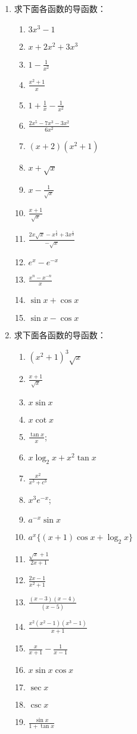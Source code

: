 \begin{ex}
\begin{enumerate}
    \item  求下面各函数的导函数：
\begin{multicols}{2}
\begin{enumerate}
    \item $3 x^{3}-1$
    \item  $x+2 x^{2}+3 x^{3}$
    \item  $1-\frac{1}{x^{2}}$
    \item $\frac{x^{2}+1}{x}$
    \item  $1+\frac{1}{x}-\frac{1}{x^{2}}$
    \item  $\frac{2 x^{5}-7 x^{3}-3 x^{2}}{6 x^{2}}$
    \item  $(x+2)\left(x^{2}+1\right)$
    \item  $x+\sqrt{x}$
    \item $x-\frac{1}{\sqrt{x}}$
    \item  $\frac{x+1}{\sqrt{x}}$
    \item  $\frac{2 x \sqrt{x}-x^{\tfrac{5}{2}}+3 x^{\tfrac{1}{2}}}{-\sqrt{x}}$ \item  $e^{x}-e^{-x}$
    \item $\frac{x^{n}-x^{-n}}{x} $
    \item $\sin x+\cos x$
    \item $\sin x-\cos x$
\end{enumerate}
\end{multicols}
\item  求下面各函数的导函数：
\begin{multicols}{2}
\begin{enumerate}
    \item $\left(x^{2}+1\right)^{3} \sqrt{x}$
    \item $\frac{x+1}{\sqrt{x}}$
    \item  $x \sin x$
    \item $x \cot  x$
    \item  $\frac{\tan  x}{x}$;
    \item  $x \log _{2} x+x^{2} \tan  x$
    \item  $\frac{x^{2}}{x^{3}+c^{3}}$
    \item  $x^{3} e^{-x}$;
    \item  $a^{-x} \sin x$ 
    \item $a^{x}\{(x+1) \cos x+\log_2 x\}$
    \item $\frac{\sqrt{x}+1}{2 x+1}$ 
    \item $\frac{2 x-1}{x^{2}+1}$
    \item $\frac{(x-3)(x-4)}{(x-5)}$
    \item  $\frac{x^{2}\left(x^{2}-1\right)\left(x^{3}-1\right)}{x+1}$
    \item  $\frac{x}{x+1}-\frac{1}{x-1}$
    \item  $x \sin x \cos x$
    \item $\sec x $ 
    \item $\csc x$
    \item $\frac{\sin x}{1+\tan  x}$
\end{enumerate}
\end{multicols}


\end{enumerate}
\end{ex}
